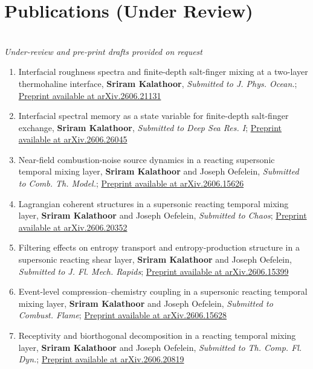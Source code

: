 \documentclass[letterpaper,11pt]{article}
\begin{document}
\section{Publications (Under Review)}
~\\
\emph{Under-review and pre-print drafts provided on request}~\\
  \begin{enumerate}
    \item {Interfacial roughness spectra and finite-depth salt-finger mixing at a two-layer thermohaline interface}, \textbf{Sriram Kalathoor}, \emph{Submitted to J. Phys. Ocean.}; \href{https://doi.org/10.48550/arXiv.2606.21131}{Preprint available at arXiv.2606.21131}
    \item {Interfacial spectral memory as a state variable for finite-depth salt-finger exchange}, \textbf{Sriram Kalathoor}, \emph{Submitted to Deep Sea Res. I}; \href{https://doi.org/10.48550/arXiv.2606.26045}{Preprint available at arXiv.2606.26045}
    \item {Near-field combustion-noise source dynamics in a reacting supersonic temporal mixing layer}, \textbf{Sriram Kalathoor} and Joseph Oefelein, \emph{Submitted to Comb. Th. Model.}; \href{https://doi.org/10.48550/arXiv.2606.15626}{Preprint available at arXiv.2606.15626}
    \item {Lagrangian coherent structures in a supersonic reacting temporal mixing layer}, \textbf{Sriram Kalathoor} and Joseph Oefelein, \emph{Submitted to Chaos}; \href{https://doi.org/10.48550/arXiv.2606.20352}{Preprint available at arXiv.2606.20352}
    \item {Filtering effects on entropy transport and entropy-production structure in a supersonic reacting shear layer}, \textbf{Sriram Kalathoor} and Joseph Oefelein, \emph{Submitted to J. Fl. Mech. Rapids}; \href{https://doi.org/10.48550/arXiv.2606.15399}{Preprint available at arXiv.2606.15399}
    \item {Event-level compression--chemistry coupling in a supersonic reacting temporal mixing layer}, \textbf{Sriram Kalathoor} and Joseph Oefelein, \emph{Submitted to Combust. Flame}; \href{https://doi.org/10.48550/arXiv.2606.15628}{Preprint available at arXiv.2606.15628}
    \item {Receptivity and biorthogonal decomposition in a reacting temporal mixing layer}, \textbf{Sriram Kalathoor} and Joseph Oefelein, \emph{Submitted to Th. Comp. Fl. Dyn.}; \href{https://doi.org/10.48550/arXiv.2606.20819}{Preprint available at arXiv.2606.20819}
\end{enumerate}
\end{document}

